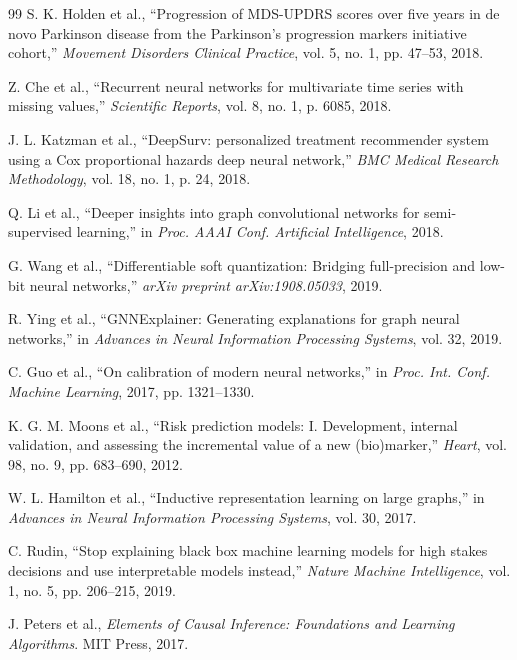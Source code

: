 \documentclass[pdflatex,sn-mathphys-num]{sn-jnl}
\begin{document}
\begin{thebibliography}{99}
S. K. Holden et al., ``Progression of MDS-UPDRS scores over five years in de novo Parkinson disease from the Parkinson's progression markers initiative cohort,'' \textit{Movement Disorders Clinical Practice}, vol. 5, no. 1, pp. 47--53, 2018.

Z. Che et al., ``Recurrent neural networks for multivariate time series with missing values,'' \textit{Scientific Reports}, vol. 8, no. 1, p. 6085, 2018.

J. L. Katzman et al., ``DeepSurv: personalized treatment recommender system using a Cox proportional hazards deep neural network,'' \textit{BMC Medical Research Methodology}, vol. 18, no. 1, p. 24, 2018.

Q. Li et al., ``Deeper insights into graph convolutional networks for semi-supervised learning,'' in \textit{Proc. AAAI Conf. Artificial Intelligence}, 2018.

G. Wang et al., ``Differentiable soft quantization: Bridging full-precision and low-bit neural networks,'' \textit{arXiv preprint arXiv:1908.05033}, 2019.

R. Ying et al., ``GNNExplainer: Generating explanations for graph neural networks,'' in \textit{Advances in Neural Information Processing Systems}, vol. 32, 2019.

C. Guo et al., ``On calibration of modern neural networks,'' in \textit{Proc. Int. Conf. Machine Learning}, 2017, pp. 1321--1330.

K. G. M. Moons et al., ``Risk prediction models: I. Development, internal validation, and assessing the incremental value of a new (bio)marker,'' \textit{Heart}, vol. 98, no. 9, pp. 683--690, 2012.

W. L. Hamilton et al., ``Inductive representation learning on large graphs,'' in \textit{Advances in Neural Information Processing Systems}, vol. 30, 2017.

C. Rudin, ``Stop explaining black box machine learning models for high stakes decisions and use interpretable models instead,'' \textit{Nature Machine Intelligence}, vol. 1, no. 5, pp. 206--215, 2019.

J. Peters et al., \textit{Elements of Causal Inference: Foundations and Learning Algorithms}. MIT Press, 2017.


\end{thebibliography}
\end{document}
